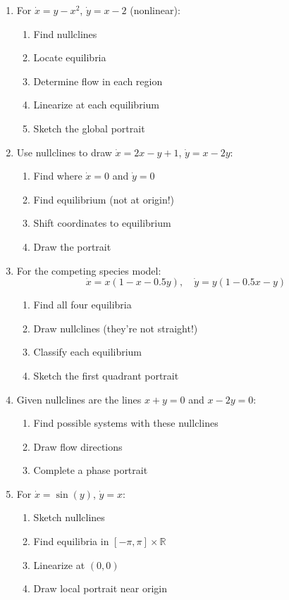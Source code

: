 \documentclass[12pt]{article}
\begin{document}
\begin{enumerate}[resume]
\item For $\dot{x} = y - x^{2}$, $\dot{y} = x - 2$ (nonlinear):
\begin{enumerate}[label=(\alph*)]
    \item Find nullclines
    \item Locate equilibria
    \item Determine flow in each region
    \item Linearize at each equilibrium
    \item Sketch the global portrait
\end{enumerate}

\item Use nullclines to draw $\dot{x} = 2x - y + 1$, $\dot{y} = x - 2y$:
\begin{enumerate}[label=(\alph*)]
    \item Find where $\dot{x} = 0$ and $\dot{y} = 0$
    \item Find equilibrium (not at origin!)
    \item Shift coordinates to equilibrium
    \item Draw the portrait
\end{enumerate}

\item For the competing species model:
$$\dot{x} = x(1 - x - 0.5y), \quad \dot{y} = y(1 - 0.5x - y)$$
\begin{enumerate}[label=(\alph*)]
    \item Find all four equilibria
    \item Draw nullclines (they're not straight!)
    \item Classify each equilibrium
    \item Sketch the first quadrant portrait
\end{enumerate}

\item Given nullclines are the lines $x + y = 0$ and $x - 2y = 0$:
\begin{enumerate}[label=(\alph*)]
    \item Find possible systems with these nullclines
    \item Draw flow directions
    \item Complete a phase portrait
\end{enumerate}

\item For $\dot{x} = \sin(y)$, $\dot{y} = x$:
\begin{enumerate}[label=(\alph*)]
    \item Sketch nullclines
    \item Find equilibria in $[-\pi, \pi] \times \mathbb{R}$
    \item Linearize at $(0, 0)$
    \item Draw local portrait near origin
\end{enumerate}
\end{enumerate}
\end{document}
